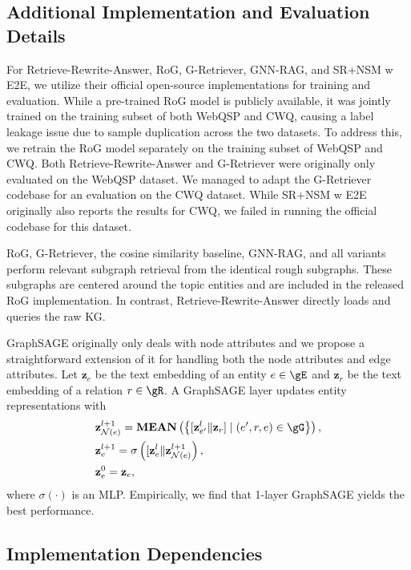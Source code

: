 \subsection{Additional Implementation and Evaluation Details}
\label{appendix:retrieval_exp_details}

For Retrieve-Rewrite-Answer, RoG, G-Retriever, GNN-RAG, and SR+NSM w E2E, we utilize their official open-source implementations for training and evaluation. While a pre-trained RoG model is publicly available, it was jointly trained on the training subset of both WebQSP and CWQ, causing a label leakage issue due to sample duplication across the two datasets. To address this, we retrain the RoG model separately on the training subset of WebQSP and CWQ. Both Retrieve-Rewrite-Answer and G-Retriever were originally only evaluated on the WebQSP dataset. We managed to adapt the G-Retriever codebase for an evaluation on the CWQ dataset. While SR+NSM w E2E originally also reports the results for CWQ, we failed in running the official codebase for this dataset.

RoG, G-Retriever, the cosine similarity baseline, GNN-RAG, and all \proj variants perform relevant subgraph retrieval from the identical rough subgraphs. These subgraphs are centered around the topic entities and are included in the released RoG implementation. In contrast, Retrieve-Rewrite-Answer directly loads and queries the raw KG.

GraphSAGE originally only deals with node attributes and we propose a straightforward extension of it for handling both the node attributes and edge attributes. Let $\textbf{z}_e$ be the text embedding of an entity $e\in \gE$ and $\textbf{z}_r$ be the text embedding of a relation $r\in \gR$. A GraphSAGE layer updates entity representations with 
\begin{align}
    & \textbf{z}_{\mathcal{N}(e)}^{l+1} = \textbf{MEAN}\left(
        \left\{
            [\textbf{z}_{e'}^{l} \|  \textbf{z}_r]      
            \mid 
            (e', r, e) \in \gG
        \right\}
    \right),
    \\
    & \textbf{z}_{e}^{l+1} = \sigma\left([\textbf{z}_{e}^{l} \|  \textbf{z}_{\mathcal{N}(e)}^{l+1}\right),
    \\
    & \textbf{z}_{e}^{0} = \textbf{z}_e,
\end{align}
where $\sigma(\cdot)$ is an MLP. Empirically, we find that 1-layer GraphSAGE yields the best performance.

\subsection{Implementation Dependencies}

